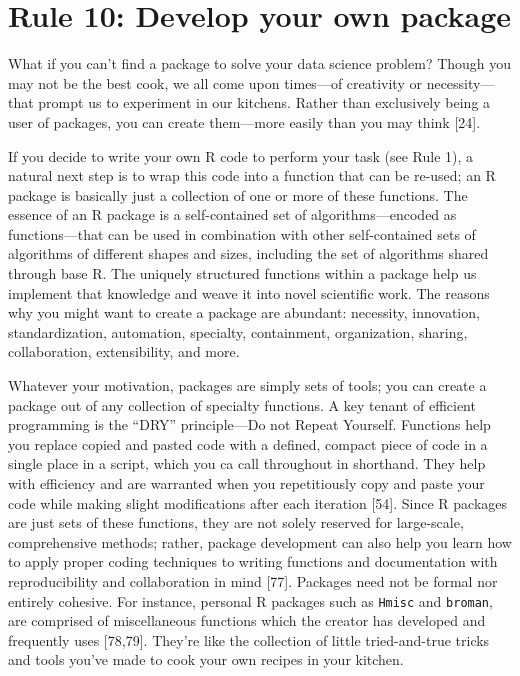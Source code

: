 \documentclass[10pt,letterpaper]{article}
\begin{document}
\hypertarget{rule-10-develop-your-own-package}{%
\section{Rule 10: Develop your own
package}\label{rule-10-develop-your-own-package}}

What if you can't find a package to solve your data science problem?
Though you may not be the best cook, we all come upon times---of
creativity or necessity---that prompt us to experiment in our kitchens.
Rather than exclusively being a user of packages, you can create
them---more easily than you may think {[}24{]}.

If you decide to write your own R code to perform your task (see Rule
1), a natural next step is to wrap this code into a function that can be
re-used; an R package is basically just a collection of one or more of
these functions. The essence of an R package is a self-contained set of
algorithms---encoded as functions---that can be used in combination with
other self-contained sets of algorithms of different shapes and sizes,
including the set of algorithms shared through base R. The uniquely
structured functions within a package help us implement that knowledge
and weave it into novel scientific work. The reasons why you might want
to create a package are abundant: necessity, innovation,
standardization, automation, specialty, containment, organization,
sharing, collaboration, extensibility, and more.

Whatever your motivation, packages are simply sets of tools; you can
create a package out of any collection of specialty functions. A key
tenant of efficient programming is the ``DRY'' principle---Do not Repeat
Yourself. Functions help you replace copied and pasted code with a
defined, compact piece of code in a single place in a script, which you
ca call throughout in shorthand. They help with efficiency and are
warranted when you repetitiously copy and paste your code while making
slight modifications after each iteration {[}54{]}. Since R packages are
just sets of these functions, they are not solely reserved for
large-scale, comprehensive methods; rather, package development can also
help you learn how to apply proper coding techniques to writing
functions and documentation with reproducibility and collaboration in
mind {[}77{]}. Packages need not be formal nor entirely cohesive. For
instance, personal R packages such as \texttt{Hmisc} and
\texttt{broman}, are comprised of miscellaneous functions which the
creator has developed and frequently uses {[}78,79{]}. They're like the
collection of little tried-and-true tricks and tools you've made to cook
your own recipes in your kitchen.
\end{document}

